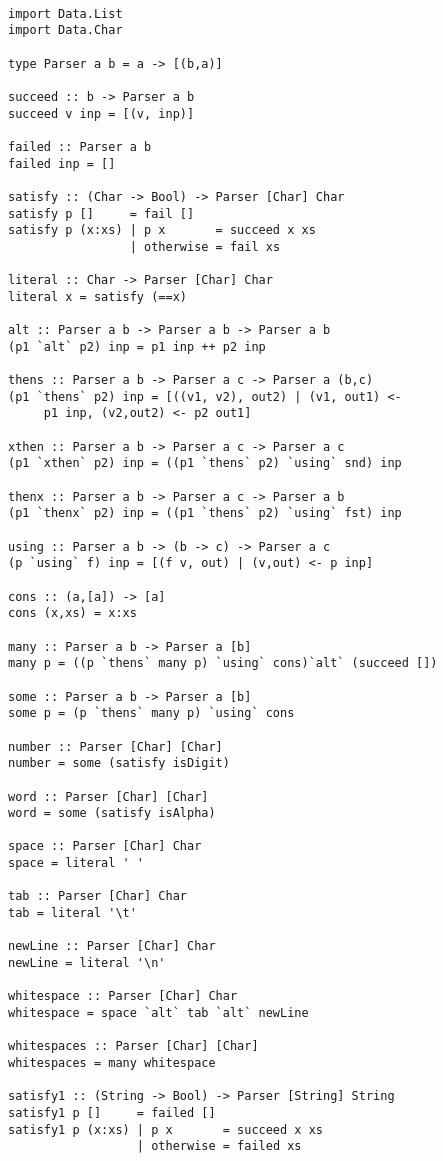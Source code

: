 \documentclass[11pt]{article}
\begin{document}
\begin{verbatim}

import Data.List
import Data.Char

type Parser a b = a -> [(b,a)]

succeed :: b -> Parser a b
succeed v inp = [(v, inp)]

failed :: Parser a b
failed inp = []

satisfy :: (Char -> Bool) -> Parser [Char] Char
satisfy p []     = fail []
satisfy p (x:xs) | p x       = succeed x xs
                 | otherwise = fail xs

literal :: Char -> Parser [Char] Char
literal x = satisfy (==x)

alt :: Parser a b -> Parser a b -> Parser a b
(p1 `alt` p2) inp = p1 inp ++ p2 inp

thens :: Parser a b -> Parser a c -> Parser a (b,c)
(p1 `thens` p2) inp = [((v1, v2), out2) | (v1, out1) <-
     p1 inp, (v2,out2) <- p2 out1]  

xthen :: Parser a b -> Parser a c -> Parser a c
(p1 `xthen` p2) inp = ((p1 `thens` p2) `using` snd) inp

thenx :: Parser a b -> Parser a c -> Parser a b
(p1 `thenx` p2) inp = ((p1 `thens` p2) `using` fst) inp

using :: Parser a b -> (b -> c) -> Parser a c
(p `using` f) inp = [(f v, out) | (v,out) <- p inp]

cons :: (a,[a]) -> [a]
cons (x,xs) = x:xs

many :: Parser a b -> Parser a [b]
many p = ((p `thens` many p) `using` cons)`alt` (succeed [])

some :: Parser a b -> Parser a [b]
some p = (p `thens` many p) `using` cons

number :: Parser [Char] [Char]
number = some (satisfy isDigit)

word :: Parser [Char] [Char]
word = some (satisfy isAlpha)

space :: Parser [Char] Char
space = literal ' '

tab :: Parser [Char] Char
tab = literal '\t' 

newLine :: Parser [Char] Char
newLine = literal '\n'

whitespace :: Parser [Char] Char
whitespace = space `alt` tab `alt` newLine 

whitespaces :: Parser [Char] [Char]
whitespaces = many whitespace 

satisfy1 :: (String -> Bool) -> Parser [String] String
satisfy1 p []     = failed []
satisfy1 p (x:xs) | p x       = succeed x xs
                  | otherwise = failed xs


\end{verbatim}
\end{document}
